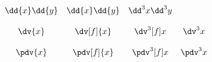 \documentclass{unittest}
\begin{document}
\(\begin{array}{ccccc}
\\\\%
	\dd{x}\dd{y} & \dd{x}\dd{y} &\dd^3{x}\dd^3{y}
\\\\%
	\dv{x} & \dv[f]{x} & \dv^3[f]{x} & \dv^3{}{x}
\\\\%
	\pdv{x} & \pdv[f]{x} & \pdv^3[f]{x} & \pdv^3{}{x}
\\\\
\end{array}\)
\end{document}
